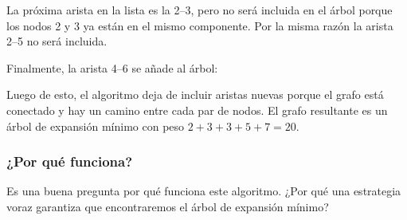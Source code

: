 La próxima arista en la lista es la 2--3, pero no será incluida
en el árbol porque los nodos 2 y 3 ya están en el mismo componente.
Por la misma razón la arista 2--5 no será incluida.

\begin{samepage}
    Finalmente, la arista 4--6 se añade al árbol:
    \begin{center}
    \end{center}
\end{samepage}

Luego de esto, el algoritmo deja de incluir aristas nuevas
porque el grafo está conectado y hay un camino entre cada par de
nodos. El grafo resultante es un árbol de expansión mínimo con peso
$2+3+3+5+7=20$.

\subsubsection{¿Por qué funciona?}

Es una buena pregunta por qué funciona este algoritmo. ¿Por qué
una estrategia voraz garantiza que encontraremos el árbol de expansión
mínimo?

